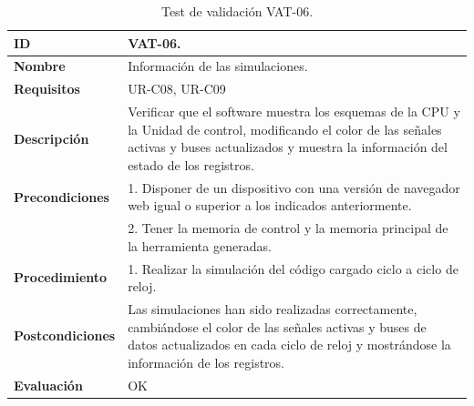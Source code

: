 \begin{center}
\begin{table}[htb]
\centering
\caption{Test de validación VAT-06.}
\label{tab:vat-06}
\begin{tabular}{@{}p{2.5cm} p{9cm}@{}} 
\toprule
\textbf{ID} 					& VAT-06. \\
\midrule
\textbf{Nombre} 				& Información de las simulaciones. \\
\midrule
\textbf{Requisitos} 		& UR-C08, UR-C09\\
\midrule
\textbf{Descripción} 		& Verificar que el software muestra los esquemas de la CPU y la Unidad de control, modificando el color de las señales activas y buses actualizados y muestra la información del estado de los registros. \\
\midrule
\textbf{Precondiciones}		& 1. Disponer de un dispositivo con una versión de navegador web igual o superior a los indicados anteriormente. \\
											& 2. Tener la memoria de control y la memoria principal de la herramienta generadas. \\
\midrule
\textbf{Procedimiento}		& 1. Realizar la simulación del código cargado ciclo a ciclo de reloj.\\
\midrule
\textbf{Postcondiciones} 		&  Las simulaciones han sido realizadas correctamente, cambiándose el color de las señales activas y buses de datos actualizados en cada ciclo de reloj y mostrándose la información de los registros.\\
\midrule
\textbf{Evaluación} 			& OK \\
\bottomrule
\end{tabular}
\end{table}
\end{center}

